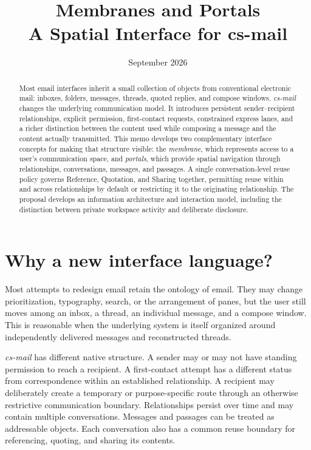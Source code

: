 \documentclass[11pt]{article}
\title{\textbf{Membranes and Portals}\\\large A Spatial Interface for cs-mail}
\author{}
\date{September 2026}
\newcommand{\csmail}{\textit{cs-mail}}
\begin{document}
\maketitle

\begin{abstract}
Most email interfaces inherit a small collection of objects from conventional electronic mail: inboxes, folders, messages, threads, quoted replies, and compose windows. \csmail{} changes the underlying communication model. It introduces persistent sender--recipient relationships, explicit permission, first-contact requests, constrained express lanes, and a richer distinction between the content used while composing a message and the content actually transmitted. This memo develops two complementary interface concepts for making that structure visible: the \emph{membrane}, which represents access to a user's communication space, and \emph{portals}, which provide spatial navigation through relationships, conversations, messages, and passages. A single conversation-level reuse policy governs Reference, Quotation, and Sharing together, permitting reuse within and across relationships by default or restricting it to the originating relationship. The proposal develops an information architecture and interaction model, including the distinction between private workspace activity and deliberate disclosure.
\end{abstract}

\section{Why a new interface language?}

Most attempts to redesign email retain the ontology of email. They may change prioritization, typography, search, or the arrangement of panes, but the user still moves among an inbox, a thread, an individual message, and a compose window. This is reasonable when the underlying system is itself organized around independently delivered messages and reconstructed threads.

\csmail{} has different native structure. A sender may or may not have standing permission to reach a recipient. A first-contact attempt has a different status from correspondence within an established relationship. A recipient may deliberately create a temporary or purpose-specific route through an otherwise restrictive communication boundary. Relationships persist over time and may contain multiple conversations. Messages and passages can be treated as addressable objects. Each conversation also has a common reuse boundary for referencing, quoting, and sharing its contents.
\end{document}
